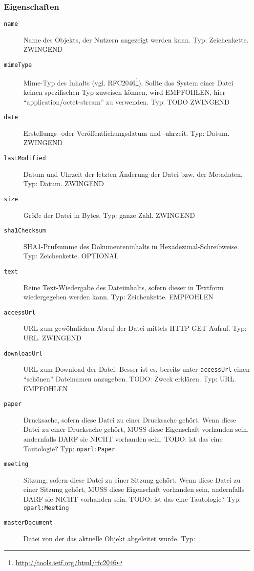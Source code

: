 \documentclass[,a4paper]{article}
\begin{document}
\subsubsection{Eigenschaften}\label{eigenschaften-7}

\begin{description}
\item[\texttt{name}]
Name des Objekts, der Nutzern angezeigt werden kann. Typ: Zeichenkette.
ZWINGEND
\item[\texttt{mimeType}]
Mime-Typ des Inhalts (vgl. RFC2046\footnote{\url{http://tools.ietf.org/html/rfc2046}}).
Sollte das System einer Datei keinen spezifischen Typ zuweisen können,
wird EMPFOHLEN, hier ``application/octet-stream'' zu verwenden. Typ:
TODO ZWINGEND
\item[\texttt{date}]
Erstellungs- oder Veröffentlichungsdatum und -uhrzeit. Typ: Datum.
ZWINGEND
\item[\texttt{lastModified}]
Datum und Uhrzeit der letzten Änderung der Datei bzw. der Metadaten.
Typ: Datum. ZWINGEND
\item[\texttt{size}]
Größe der Datei in Bytes. Typ: ganze Zahl. ZWINGEND
\item[\texttt{sha1Checksum}]
SHA1-Prüfsumme des Dokumenteninhalts in Hexadezimal-Schreibweise. Typ:
Zeichenkette. OPTIONAL
\item[\texttt{text}]
Reine Text-Wiedergabe des Dateiinhalts, sofern dieser in Textform
wiedergegeben werden kann. Typ: Zeichenkette. EMPFOHLEN
\item[\texttt{accessUrl}]
URL zum gewöhnlichen Abruf der Datei mittels HTTP GET-Aufruf. Typ: URL.
ZWINGEND
\item[\texttt{downloadUrl}]
URL zum Download der Datei. Besser ist es, bereits unter
\texttt{accessUrl} einen ``schönen'' Dateinamen anzugeben. TODO: Zweck
erklären. Typ: URL. EMPFOHLEN
\item[\texttt{paper}]
Drucksache, sofern diese Datei zu einer Drucksache gehört. Wenn diese
Datei zu einer Drucksache gehört, MUSS diese Eigenschaft vorhanden sein,
andernfalls DARF sie NICHT vorhanden sein. TODO: ist das eine
Tautologie? Typ: \texttt{oparl:Paper}
\item[\texttt{meeting}]
Sitzung, sofern diese Datei zu einer Sitzung gehört. Wenn diese Datei zu
einer Sitzung gehört, MUSS diese Eigenschaft vorhanden sein, andernfalls
DARF sie NICHT vorhanden sein. TODO: ist das eine Tautologie? Typ:
\texttt{oparl:Meeting}
\item[\texttt{masterDocument}]
Datei von der das aktuelle Objekt abgeleitet wurde. Typ:

\end{description}
\end{document}
